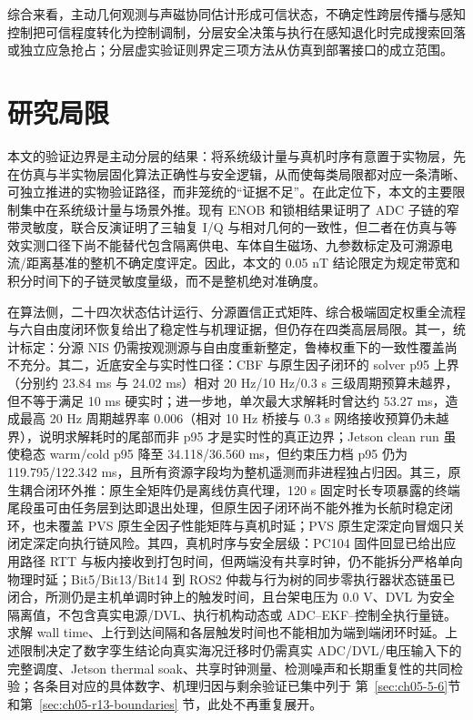 综合来看，主动几何观测与声磁协同估计形成可信状态，不确定性跨层传播与感知控制把可信程度转化为控制调制，分层安全决策与执行在感知退化时完成搜索回落或独立应急抢占；分层虚实验证则界定三项方法从仿真到部署接口的成立范围。

\section{研究局限}\label{sec:ch06-6-2}

本文的验证边界是主动分层的结果：将系统级计量与真机时序有意置于实物层，先在仿真与半实物层固化算法正确性与安全逻辑，从而使每类局限都对应一条清晰、可独立推进的实物验证路径，而非笼统的``证据不足''。在此定位下，本文的主要限制集中在系统级计量与场景外推。现有 ENOB 和锁相结果证明了 ADC 子链的窄带灵敏度，联合反演证明了三轴复 I/Q 与相对几何的一致性，但二者在仿真与等效实测口径下尚不能替代包含隔离供电、车体自生磁场、九参数标定及可溯源电流/距离基准的整机不确定度评定。因此，本文的 0.05 nT 结论限定为规定带宽和积分时间下的子链灵敏度量级，而不是整机绝对准确度。

在算法侧，二十四次状态估计运行、分源置信正式矩阵、综合极端固定权重全流程与六自由度闭环恢复给出了稳定性与机理证据，但仍存在四类高层局限。其一，统计标定：分源 NIS 仍需按观测源与自由度重新整定，鲁棒权重下的一致性覆盖尚不充分。其二，近底安全与实时性口径：CBF 与原生因子闭环的 solver p95 上界（分别约 23.84 ms 与 24.02 ms）相对 20 Hz/10 Hz/0.3 s 三级周期预算未越界，但不等于满足 10 ms 硬实时；进一步地，单次最大求解耗时曾达约 53.27 ms，造成最高 20 Hz 周期越界率 0.006（相对 10 Hz 桥接与 0.3 s 网络接收预算仍未越界），说明求解耗时的尾部而非 p95 才是实时性的真正边界；Jetson clean run 虽使稳态 warm/cold p95 降至 34.118/36.560 ms，但约束压力档 p95 仍为 119.795/122.342 ms，且所有资源字段均为整机遥测而非进程独占归因。其三，原生耦合闭环外推：原生全矩阵仍是离线仿真代理，120 s 固定时长专项暴露的终端尾段虽可由任务层到达即退出处理，但原生因子闭环尚不能外推为长航时稳定闭环，也未覆盖 PVS 原生全因子性能矩阵与真机时延；PVS 原生定深定向冒烟只关闭定深定向执行链风险。其四，真机时序与安全层级：PC104 固件回显已给出应用路径 RTT 与板内接收到打包时间，但两端没有共享时钟，仍不能拆分严格单向物理时延；Bit5/Bit13/Bit14 到 ROS2 仲裁与行为树的同步零执行器状态链虽已闭合，所测仍是主机单调时钟上的触发时间，且台架电压为 0.0 V、DVL 为安全隔离值，不包含真实电源/DVL、执行机构动态或 ADC--EKF--控制全执行量链。求解 wall time、上行到达间隔和各层触发时间也不能相加为端到端闭环时延。上述限制决定了数字孪生结论向真实海况迁移时仍需真实 ADC/DVL/电压输入下的完整调度、Jetson thermal soak、共享时钟测量、检测噪声和长期重复性的共同检验；各条目对应的具体数字、机理归因与剩余验证已集中列于 第~\ref{sec:ch05-5-6}节 和第~\ref{sec:ch05-r13-boundaries} 节，此处不再重复展开。

